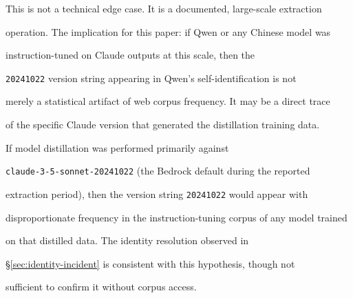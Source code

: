 This is not a technical edge case. It is a documented, large-scale extraction





operation. The implication for this paper: if Qwen or any Chinese model was





instruction-tuned on Claude outputs at this scale, then the





\texttt{20241022} version string appearing in Qwen's self-identification is not





merely a statistical artifact of web corpus frequency. It may be a direct trace





of the specific Claude version that generated the distillation training data.











\begin{hypothesis}





\label{hyp:distillation-trace}





If model distillation was performed primarily against





\texttt{claude-3-5-sonnet-20241022} (the Bedrock default during the reported





extraction period), then the version string \texttt{20241022} would appear with





disproportionate frequency in the instruction-tuning corpus of any model trained





on that distilled data. The identity resolution observed in





\S\ref{sec:identity-incident} is consistent with this hypothesis, though not





sufficient to confirm it without corpus access.





\end{hypothesis}











